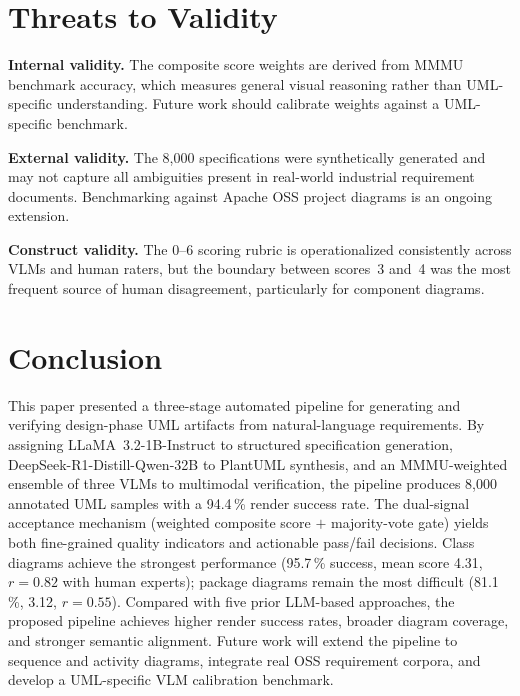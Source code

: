 \documentclass[conference]{IEEEtran}
\begin{document}
\section{Threats to Validity}

\textbf{Internal validity.} The composite score weights are derived
from MMMU benchmark accuracy, which measures general visual reasoning
rather than UML-specific understanding. Future work should calibrate
weights against a UML-specific benchmark.

\textbf{External validity.} The 8,000 specifications were
synthetically generated and may not capture all ambiguities present
in real-world industrial requirement documents. Benchmarking against
Apache OSS project diagrams is an ongoing extension.

\textbf{Construct validity.} The 0--6 scoring rubric is operationalized
consistently across VLMs and human raters, but the boundary between
scores~3 and~4 was the most frequent source of human disagreement,
particularly for component diagrams.

\section{Conclusion}

This paper presented a three-stage automated pipeline for generating
and verifying design-phase UML artifacts from natural-language
requirements. By assigning LLaMA~3.2-1B-Instruct to structured
specification generation, DeepSeek-R1-Distill-Qwen-32B to PlantUML
synthesis, and an MMMU-weighted ensemble of three VLMs to multimodal
verification, the pipeline produces 8,000 annotated UML samples with
a 94.4\,\% render success rate. The dual-signal acceptance mechanism
(weighted composite score $+$ majority-vote gate) yields both
fine-grained quality indicators and actionable pass/fail decisions.
Class diagrams achieve the strongest performance (95.7\,\% success,
mean score 4.31, $r = 0.82$ with human experts); package diagrams
remain the most difficult (81.1\,\%, 3.12, $r = 0.55$). Compared
with five prior LLM-based approaches, the proposed pipeline achieves
higher render success rates, broader diagram coverage, and stronger
semantic alignment. Future work will extend the pipeline to sequence
and activity diagrams, integrate real OSS requirement corpora, and
develop a UML-specific VLM calibration benchmark.




\balance
\end{document}
